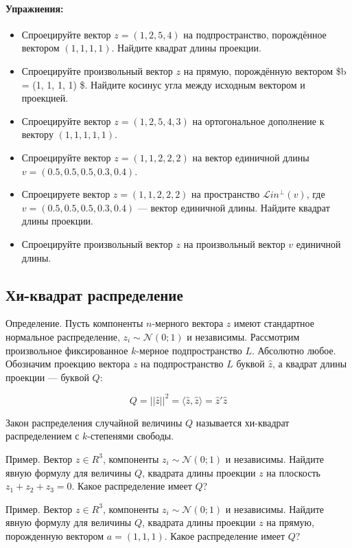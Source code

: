 \documentclass[11pt,russian,]{article}
\let\oldparagraph\paragraph
\renewcommand{\paragraph}[1]{\oldparagraph{#1}\mbox{}}
\newcommand{\cN}{\mathcal{N}}
\newcommand{\1}{\mathbbm{1}}
\newcommand{\Lin}{\mathcal{L}in}
\newcommand{\Linp}{\Lin^{\perp}}
\begin{document}
\paragraph{Упражнения:}\label{-1}

\begin{itemize}
\item
  Спроецируйте вектор \(z=(1, 2, 5, 4)\) на подпространство, порождённое
  вектором \((1, 1, 1, 1)\). Найдите квадрат длины проекции.
\item
  Спроецируйте произвольный вектор \(z\) на прямую, порождённую вектором
  \$b = (1, 1, 1, 1) \$. Найдите косинус угла между исходным вектором и
  проекцией.
\item
  Спроецируйте вектор \(z=(1, 2, 5, 4, 3)\) на ортогональное дополнение
  к вектору \((1, 1, 1, 1, 1)\).
\item
  Спроецируйте вектор \(z=(1, 1, 2, 2, 2)\) на вектор единичной длины
  \(v = (0.5, 0.5, 0.5, 0.3, 0.4)\).
\item
  Спроецируете вектор \(z=(1, 1, 2, 2, 2)\) на пространство
  \(\Linp(v)\), где \(v = (0.5, 0.5, 0.5, 0.3, 0.4)\) --- вектор
  единичной длины. Найдите квадрат длины проекции.
\item
  Спроецируйте произвольный вектор \(z\) на произвольный вектор \(v\)
  единичной длины.
\end{itemize}

\subsection{Хи-квадрат распределение}\label{--}

Определение. Пусть компоненты \(n\)-мерного вектора \(z\) имеют
стандартное нормальное распределение, \(z_i \sim \cN(0;1)\) и
независимы. Рассмотрим произвольное фиксированное \(k\)-мерное
подпространство \(L\). Абсолютно любое. Обозначим проекцию вектора \(z\)
на подпространство \(L\) буквой \(\hat z\), а квадрат длины проекции ---
буквой \(Q\):

\[
Q = ||\hat z||^2 = \langle \hat z, \hat z\rangle = \hat z'\hat z
\]

Закон распределения случайной величины \(Q\) называется хи-квадрат
распределением с \(k\)-степенями свободы.

Пример. Вектор \(z \in R^3\), компоненты \(z_i \sim \cN(0;1)\) и
независимы. Найдите явную формулу для величины \(Q\), квадрата длины
проекции \(z\) на плоскость \(z_1 + z_2 + z_3 =0\). Какое распределение
имеет \(Q\)?

Пример. Вектор \(z \in R^3\), компоненты \(z_i \sim \cN(0;1)\) и
независимы. Найдите явную формулу для величины \(Q\), квадрата длины
проекции \(z\) на прямую, порожденную вектором \(a = (1, 1, 1)\). Какое
распределение имеет \(Q\)?
\end{document}
